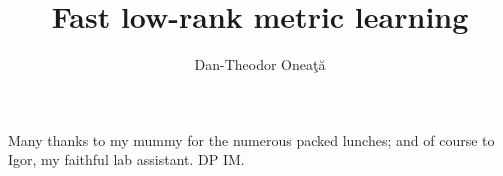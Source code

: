 \documentclass[msc,ai,logo,notimes]{infthesis}  %
\title{Fast low-rank metric learning}
\author{Dan-Theodor Onea\c{t}\u{a}}
\begin{document}
\begin{preliminary}

\maketitle

\begin{acknowledgements}
Many thanks to my mummy for the numerous packed lunches; and of course to
Igor, my faithful lab assistant. DP IM.
\end{acknowledgements}

\standarddeclaration


\tableofcontents


\end{preliminary}


%
%


% 

%



\singlespace



\end{document}
